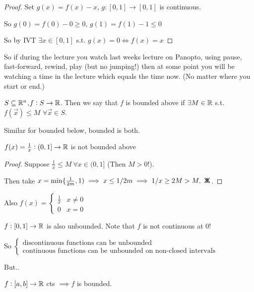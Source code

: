 \documentclass[twoside]{scrartcl}
\newcommand*{\cont}{%
  \mathsf{X}\mkern-8.5mu\mathsf{X}%
}
\begin{document}
\begin{proof}
Set $g(x) = f(x) - x$, $g: [0,1] \to [0,1]$ is continuous. 

So $g(0) = f(0) - 0 \geq 0$, $g(1) = f(1) -1 \leq 0$

So by IVT $\exists x\in[0,1]$ s.t. $g(x) = 0\iff f(x) = x$	
\end{proof}

So if during the lecture you watch last weeks lecture on Panopto, using pause, fast-forward, rewind, play (but no jumping!) then at some point you will be watching a time in the lecture which equals the time now. (No matter where you start or end.) \\

\begin{definition}
	$S \subseteq \mathbb{R}^n$,$f: S \to\mathbb{R}$. Then we say that $f$ is bounded above if $\exists M \in\mathbb{R}$ s.t. $f(\vec{x}) \leq M$ $\forall \vec{x} \in S$. 
	
	Similar for bounded below, bounded is both. 
\end{definition}

\begin{example}
$f(x) = \frac{1}{x}: (0,1] \to \mathbb{R}$ is not bounded above

\begin{proof}
Suppose $\frac{1}{x} \leq M~\forall x\in(0,1]$ (Then $M > 0!$).
 
Then take $x = \mathrm{min}\{\frac{1}{2m},1) \implies x \leq 1/2m \implies 1/x \geq 2M > M,~\cont$.
\end{proof}	
\end{example}

Also $f(x) = \begin{cases}
 \frac{1}{x} & x\neq 0\\
 0 & x = 0	
 \end{cases}$
 
 $f:[0,1]\to \mathbb{R}$ is also unbounded. Note that $f$ is not continuous at 0!
 
 So $\begin{cases}
	\mbox{discontinuous functions can be unbounded}\\
	\mbox{continuous functions can be unbounded on non-closed intervals}
\end{cases}$

But..

\begin{theorem}
$f:[a,b] \to \mathbb{R}$ cts $\implies f$ is bounded.	
\end{theorem}
\end{document}
